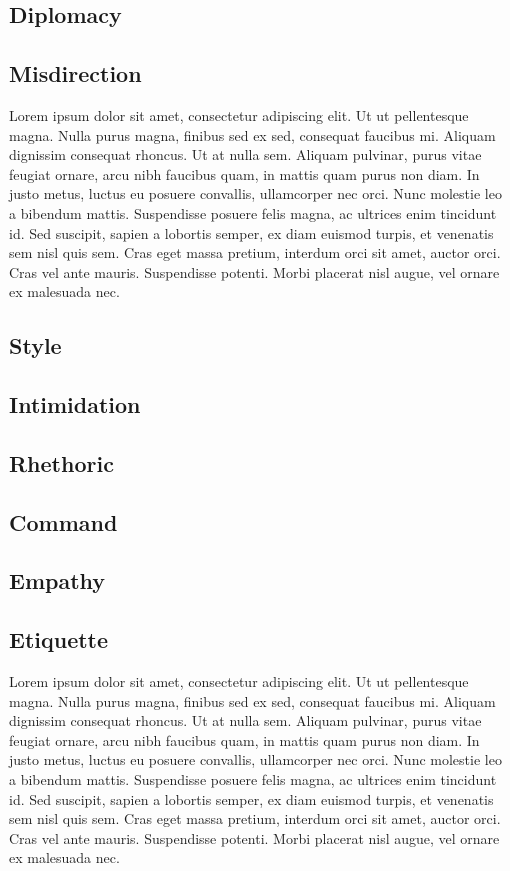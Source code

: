 \subsection{Diplomacy}\label{subsec:diplomacy}
\subsection{Misdirection}\label{subsec:misdirection}
Lorem ipsum dolor sit amet, consectetur adipiscing elit.
    Ut ut pellentesque magna.
    Nulla purus magna, finibus sed ex sed, consequat faucibus mi.
    Aliquam dignissim consequat rhoncus.
    Ut at nulla sem.
    Aliquam pulvinar, purus vitae feugiat ornare, arcu nibh faucibus quam, in mattis quam purus non diam.
    In justo metus, luctus eu posuere convallis, ullamcorper nec orci.
    Nunc molestie leo a bibendum mattis.
    Suspendisse posuere felis magna, ac ultrices enim tincidunt id.
    Sed suscipit, sapien a lobortis semper, ex diam euismod turpis, et venenatis sem nisl quis sem.
    Cras eget massa pretium, interdum orci sit amet, auctor orci.
    Cras vel ante mauris.
    Suspendisse potenti.
    Morbi placerat nisl augue, vel ornare ex malesuada nec.
\subsection{Style}\label{subsec:style}
\subsection{Intimidation}\label{subsec:intimidation}
\subsection{Rhethoric}\label{subsec:rhethoric}
\subsection{Command}\label{subsec:command}
\subsection{Empathy}\label{subsec:empathy}
\subsection{Etiquette}\label{subsec:etiquette}
Lorem ipsum dolor sit amet, consectetur adipiscing elit.
    Ut ut pellentesque magna.
    Nulla purus magna, finibus sed ex sed, consequat faucibus mi.
    Aliquam dignissim consequat rhoncus.
    Ut at nulla sem.
    Aliquam pulvinar, purus vitae feugiat ornare, arcu nibh faucibus quam, in mattis quam purus non diam.
    In justo metus, luctus eu posuere convallis, ullamcorper nec orci.
    Nunc molestie leo a bibendum mattis.
    Suspendisse posuere felis magna, ac ultrices enim tincidunt id.
    Sed suscipit, sapien a lobortis semper, ex diam euismod turpis, et venenatis sem nisl quis sem.
    Cras eget massa pretium, interdum orci sit amet, auctor orci.
    Cras vel ante mauris.
    Suspendisse potenti.
    Morbi placerat nisl augue, vel ornare ex malesuada nec.
